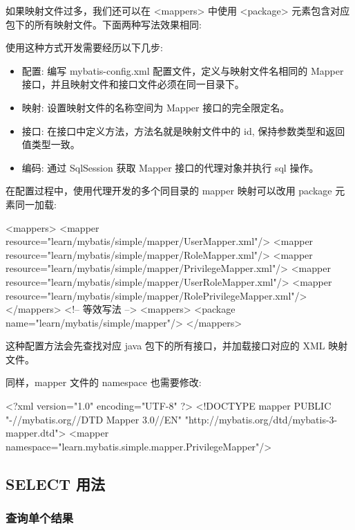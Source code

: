 如果映射文件过多，我们还可以在 <mappers> 中使用 <package> 元素包含对应包下的所有映射文件。下面两种写法效果相同:

使用这种方式开发需要经历以下几步:
\begin{itemize}
    \item 配置: 编写 mybatis-config.xml 配置文件，定义与映射文件名相同的 Mapper 接口，并且映射文件和接口文件必须在同一目录下。
    \item 映射: 设置映射文件的名称空间为 Mapper 接口的完全限定名。
    \item 接口: 在接口中定义方法，方法名就是映射文件中的 id, 保持参数类型和返回值类型一致。
    \item 编码: 通过 SqlSession 获取 Mapper 接口的代理对象并执行 sql 操作。
\end{itemize}

在配置过程中，使用代理开发的多个同目录的 mapper 映射可以改用 package 元素同一加载:

\begin{xml}
<mappers>
    <mapper resource="learn/mybatis/simple/mapper/UserMapper.xml"/>
    <mapper resource="learn/mybatis/simple/mapper/RoleMapper.xml"/>
    <mapper resource="learn/mybatis/simple/mapper/PrivilegeMapper.xml"/>
    <mapper resource="learn/mybatis/simple/mapper/UserRoleMapper.xml"/>
    <mapper resource="learn/mybatis/simple/mapper/RolePrivilegeMapper.xml"/>
</mappers>
<!-- 等效写法 -->
<mappers>
    <package name="learn/mybatis/simple/mapper"/>
</mappers>
\end{xml}

这种配置方法会先查找对应 java 包下的所有接口，并加载接口对应的 XML 映射文件。

同样，mapper 文件的 namespace 也需要修改:

\begin{xml}
<?xml version="1.0" encoding="UTF-8" ?>
<!DOCTYPE mapper PUBLIC "-//mybatis.org//DTD Mapper 3.0//EN"
        "http://mybatis.org/dtd/mybatis-3-mapper.dtd">
<mapper namespace="learn.mybatis.simple.mapper.PrivilegeMapper"/>
\end{xml}

\subsection{SELECT 用法}

\subsubsection{查询单个结果}

